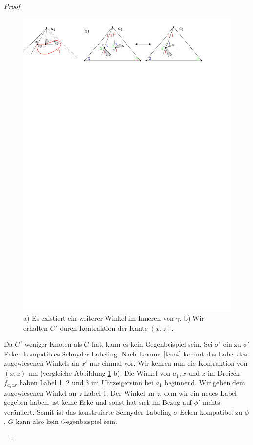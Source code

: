 \begin{proof}
\begin{description}[leftmargin =0pt, font = \rmfamily ]
\begin{figure}
\centering
\includegraphics[width=1\textwidth]{lem5_3.pdf}
\caption{a) Es existiert ein weiterer Winkel im Inneren von $\gamma$. b) Wir erhalten $G'$ durch Kontraktion der Kante $(x,z)$.}
\label{pic_lem5_3}
\end{figure}

Da $G'$ weniger Knoten als $G$ hat, kann es kein Gegenbeispiel sein. Sei $\sigma'$ ein zu $\phi'$ Ecken kompatibles Schnyder Labeling. Nach Lemma \ref{lem4} kommt das Label des zugewiesenen Winkels an $x'$ nur einmal vor. Wir kehren nun die Kontraktion von $(x,z)$ um (vergleiche Abbildung \ref{pic_lem5_3} b). Die Winkel von $a_1,x$ und $z$ im Dreieck $f_{a_1zx}$ haben Label 1, 2 und 3 im Uhrzeigersinn bei $a_1$ beginnend. Wir geben dem zugewiesenen Winkel an $z$ Label 1. Der Winkel an $z$, dem wir ein neues Label gegeben haben, ist keine Ecke und sonst hat sich im Bezug auf $\phi'$ nichts verändert. Somit ist das konstruierte Schnyder Labeling $\sigma$ Ecken kompatibel zu $\phi$. $G$ kann also kein Gegenbeispiel sein.


\end{description}
\end{proof}

